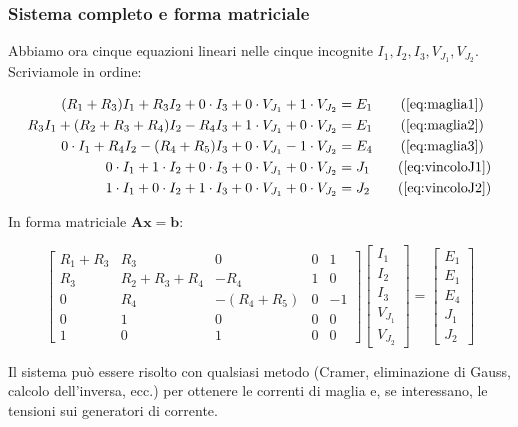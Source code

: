 \subsubsection{Sistema completo e forma matriciale}

Abbiamo ora cinque equazioni lineari nelle cinque incognite \(I_1,I_2,I_3,V_{J_1},V_{J_2}\). Scriviamole in ordine:

\begin{align}
(R_1 + R_3) I_1 + R_3 I_2 + 0 \cdot I_3 + 0 \cdot V_{J_1} + 1 \cdot V_{J_2} &= E_1 \tag{\ref{eq:maglia1}} \\
R_3 I_1 + (R_2 + R_3 + R_4) I_2 - R_4 I_3 + 1 \cdot V_{J_1} + 0 \cdot V_{J_2} &= E_1 \tag{\ref{eq:maglia2}} \\
0 \cdot I_1 + R_4 I_2 - (R_4 + R_5) I_3 + 0 \cdot V_{J_1} - 1 \cdot V_{J_2} &= E_4 \tag{\ref{eq:maglia3}} \\
0 \cdot I_1 + 1 \cdot I_2 + 0 \cdot I_3 + 0 \cdot V_{J_1} + 0 \cdot V_{J_2} &= J_1 \tag{\ref{eq:vincoloJ1}} \\
1 \cdot I_1 + 0 \cdot I_2 + 1 \cdot I_3 + 0 \cdot V_{J_1} + 0 \cdot V_{J_2} &= J_2 \tag{\ref{eq:vincoloJ2}}
\end{align}

In forma matriciale \(\mathbf{A} \mathbf{x} = \mathbf{b}\):

\[
\begin{bmatrix}
R_1+R_3 & R_3 & 0 & 0 & 1 \\
R_3 & R_2+R_3+R_4 & -R_4 & 1 & 0 \\
0 & R_4 & -(R_4+R_5) & 0 & -1 \\
0 & 1 & 0 & 0 & 0 \\
1 & 0 & 1 & 0 & 0
\end{bmatrix}
\begin{bmatrix}
I_1 \\ I_2 \\ I_3 \\ V_{J_1} \\ V_{J_2}
\end{bmatrix}
=
\begin{bmatrix}
E_1 \\ E_1 \\ E_4 \\ J_1 \\ J_2
\end{bmatrix}
\]

Il sistema può essere risolto con qualsiasi metodo (Cramer, eliminazione di Gauss, calcolo dell’inversa, ecc.) per ottenere le correnti di maglia e, se interessano, le tensioni sui generatori di corrente.

